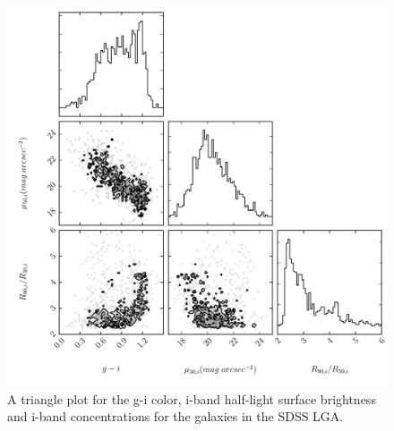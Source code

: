 \documentclass[12pt,preprint,pdftex]{aastex}
\begin{document}
\begin{figure}
\centering
\includegraphics[trim=15mm 0mm 0mm 0mm]{color_sb_conc.pdf}
\caption{A triangle plot for the g-i color, i-band half-light surface brightness and i-band concentrations for the galaxies in the SDSS LGA.}
\label{fig:triangle}
\end{figure}



\end{document}
